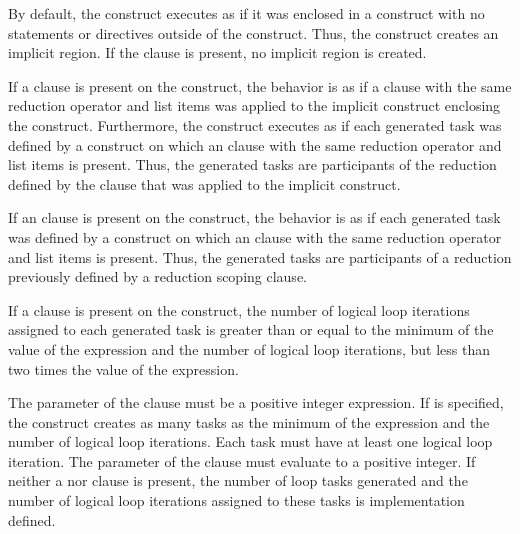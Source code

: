 By default, the  construct executes as if it was enclosed in a  construct with no statements or directives outside of the  construct. Thus, the  construct creates an implicit  region. If the  clause is present, no implicit  region is created.

If a  clause is present on the  construct, the behavior is as if a  clause with the same reduction operator and list items was applied to the implicit  construct enclosing the  construct.
Furthermore, the  construct executes as if each generated task was defined by a  construct on which an  clause with the same reduction operator and list items is present. Thus, the generated tasks are participants of the reduction defined by the  clause that was applied to the implicit  construct.

If an  clause is present on the  construct, the behavior is as if each generated task was defined by a  construct on which an  clause with the same reduction operator and list items is present. Thus, the generated tasks are participants of a reduction previously defined by a reduction scoping clause.

If a  clause is present on the  construct, the number of logical loop iterations assigned to each generated task is greater than or equal to the minimum of the value of the  expression and the number of logical loop iterations, but less than two times the value of the  expression.

The parameter of the  clause must be a positive integer expression.
If  is specified, the  construct creates as many tasks as the minimum of the  expression and the number of logical loop iterations.
Each task must have at least one logical loop iteration.
The parameter of the  clause must evaluate to a positive integer.
If neither a  nor  clause is present, the number of loop tasks generated and the number of logical loop iterations assigned to these tasks is implementation defined.

